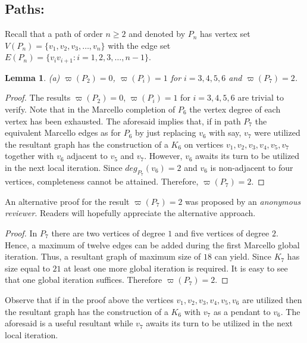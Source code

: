 \documentclass[12pt]{amsart}
\numberwithin{equation}{section}
\newtheorem{lemma}[theorem]{Lemma}
\numberwithin{equation}{section}
\begin{document}
\subsection{Paths:}
Recall that a path of order $n \geq 2$ and denoted by $P_n$ has vertex set $V(P_n) = \{v_1, v_2, v_3,\dots, v_n\}$ with the edge set $E(P_n) = \{v_iv_{i+1}:i = 1,2,3,\dots,n-1\}$.
\begin{lemma}\label{lem1}
(a) $\varpi(P_2) = 0$, $\varpi(P_i) = 1$ for $i = 3,4,5,6$ and $\varpi(P_7) = 2$.
\end{lemma}
\begin{proof}
The results $\varpi(P_2) = 0$, $\varpi(P_i) = 1$ for $i = 3,4,5,6$ are trivial to verify. Note that in the Marcello completion of $P_6$ the vertex degree of each vertex has been exhausted. The aforesaid implies that, if in path $P_7$ the equivalent Marcello edges as for $P_6$ by just replacing $v_6$ with say, $v_7$ were utilized the resultant graph has the construction of a $K_6$ on vertices $v_1,v_2,v_3,v_4,v_5,v_7$ together with $v_6$ adjacent to $v_5$ and $v_7$. However, $v_6$ awaits its turn to be utilized in the next local iteration. Since $deg_{P_7}(v_6) = 2$ and $v_6$ is non-adjacent to four vertices, completeness cannot be attained. Therefore, $\varpi(P_7) = 2$.
\end{proof}
An alternative proof for the result $\varpi(P_7) = 2$ was proposed by an \emph{anonymous reviewer}. Readers will hopefully appreciate the alternative approach.
\begin{proof}
In $P_7$ there are two vertices of degree $1$ and five vertices of degree $2$. Hence, a maximum of twelve edges can be added during the first Marcello global iteration. Thus, a resultant graph of maximum size of $18$ can yield. Since $K_7$ has size equal to $21$ at least one more global iteration is required. It is easy to see that one global iteration suffices. Therefore $\varpi(P_7) = 2$.
\end{proof} 
Observe that if in the proof above the vertices $v_1,v_2,v_3,v_4,v_5,v_6$ are utilized then the resultant graph has the construction of a $K_6$ with $v_7$ as a pendant to $v_6$. The aforesaid is a useful resultant while $v_7$ awaits its turn to be utilized in the next local iteration.
\end{document}
